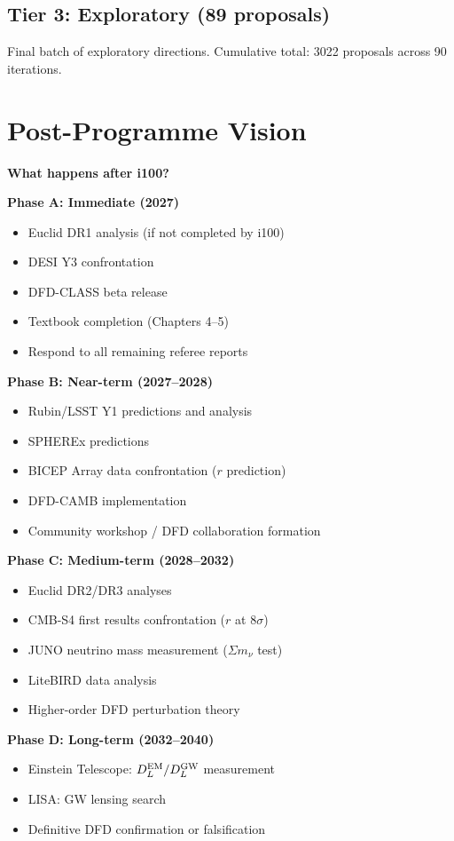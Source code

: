 \documentclass[11pt,a4paper]{article}
\begin{document}
\subsection{Tier 3: Exploratory (89 proposals)}

Final batch of exploratory directions. Cumulative total: 3022 proposals across 90 iterations.

\section{Post-Programme Vision}

\textbf{What happens after i100?}

\begin{tcolorbox}[colback=blue!5!white, colframe=dfdblue, title=\textbf{Post-i100 Research Programme (Proposed)}]

\textbf{Phase A: Immediate (2027)}
\begin{itemize}[nosep]
\item Euclid DR1 analysis (if not completed by i100)
\item DESI Y3 confrontation
\item DFD-CLASS beta release
\item Textbook completion (Chapters 4--5)
\item Respond to all remaining referee reports
\end{itemize}

\textbf{Phase B: Near-term (2027--2028)}
\begin{itemize}[nosep]
\item Rubin/LSST Y1 predictions and analysis
\item SPHEREx predictions
\item BICEP Array data confrontation ($r$ prediction)
\item DFD-CAMB implementation
\item Community workshop / DFD collaboration formation
\end{itemize}

\textbf{Phase C: Medium-term (2028--2032)}
\begin{itemize}[nosep]
\item Euclid DR2/DR3 analyses
\item CMB-S4 first results confrontation ($r$ at $8\sigma$)
\item JUNO neutrino mass measurement ($\Sigma m_\nu$ test)
\item LiteBIRD data analysis
\item Higher-order DFD perturbation theory
\end{itemize}

\textbf{Phase D: Long-term (2032--2040)}
\begin{itemize}[nosep]
\item Einstein Telescope: $D_L^{\rm EM}/D_L^{\rm GW}$ measurement
\item LISA: GW lensing search
\item Definitive DFD confirmation or falsification
\end{itemize}
\end{tcolorbox}
\end{document}
